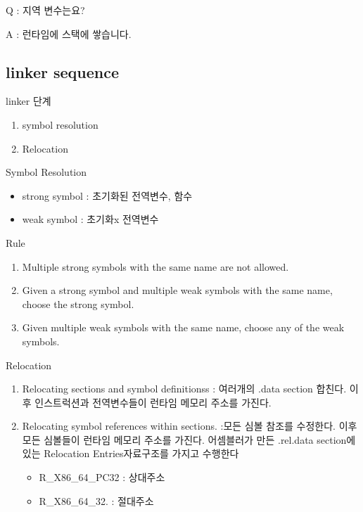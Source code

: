 \documentclass[10pt]{beamer}
\begin{document}
\begin{frame}
    Q : 지역 변수는요?

    A : 런타임에 스택에 쌓습니다.
\end{frame}



\subsection{linker sequence}

\begin{frame}{linker 단계}
    \begin{enumerate}
        \item symbol resolution
        \item Relocation
    \end{enumerate}
\end{frame}    


\begin{frame}{Symbol Resolution}
    \begin{itemize}
        \item strong symbol : 초기화된 전역변수, 함수
        \item weak symbol : 초기화x 전역변수
    \end{itemize}
    
    Rule

    \begin{enumerate}
        \item Multiple strong symbols with the same name are not allowed.
        \item Given a strong symbol and multiple weak symbols with the same name, choose the strong symbol.
        \item Given multiple weak symbols with the same name, choose any of the weak symbols.
    \end{enumerate}
\end{frame}    

\begin{frame}{Relocation}
    \begin{enumerate}
        \item Relocating sections and symbol definitionss :  여러개의 .data section 합친다. 이후 인스트럭션과 전역변수들이 런타임 메모리 주소를 가진다.
        \item Relocating symbol references within sections. :모든 심볼 참조를 수정한다. 이후  
        모든 심볼들이 런타임 메모리 주소를 가진다. 어셈블러가 만든 .rel.data section에 있는 Relocation Entries자료구조를 가지고 수행한다
        \begin{itemize}
            \item R\_X86\_64\_PC32 : 상대주소
            \item R\_X86\_64\_32. : 절대주소
        \end{itemize}
    \end{enumerate}
\end{frame}    
\end{document}
